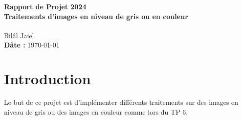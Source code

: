 \documentclass[12pt,a4paper]{article}
\begin{document}
\begin{titlepage}
    \centering
    \vspace*{1cm}
    {\Huge \textbf{Rapport de Projet 2024}} \\
    \vspace{1.5cm}
    {\Large\textbf{Traitements d'images en niveau de gris ou en couleur}} \\
    \vspace{2cm}
    \ \\
    Bilâl Jaiel \\
    \vspace{2cm}
    \textbf{Dâte :} \today \\
    \vfill
\end{titlepage}

\tableofcontents
\newpage

\section{Introduction}
Le but de ce projet est d’implémenter différents traitements sur des images en niveau de gris ou des images en couleur comme lors du TP 6. \\
\end{document}

